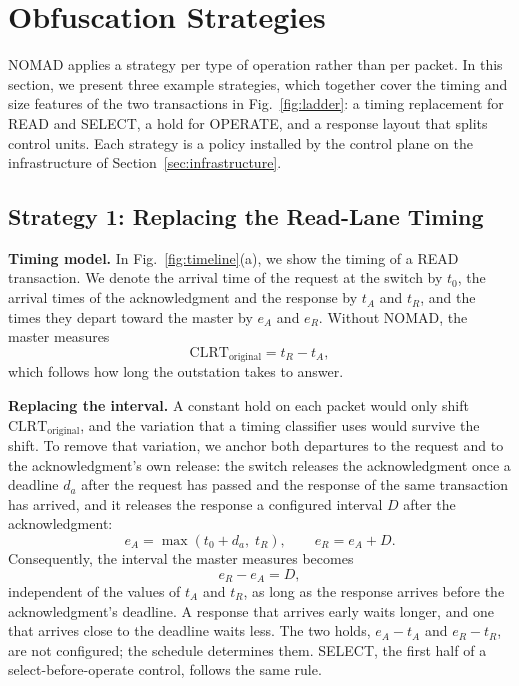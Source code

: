 \section{Obfuscation Strategies}
\label{sec:strategies}

NOMAD applies a strategy per type of operation rather than per packet. In this section, we present three example strategies, which together cover the timing and size features of the two transactions in Fig.~\ref{fig:ladder}: a timing replacement for READ and SELECT, a hold for OPERATE, and a response layout that splits control units. Each strategy is a policy installed by the control plane on the infrastructure of Section~\ref{sec:infrastructure}.

\subsection{Strategy 1: Replacing the Read-Lane Timing}

\textbf{Timing model.} In Fig.~\ref{fig:timeline}(a), we show the timing of a READ transaction. We denote the arrival time of the request at the switch by $t_0$, the arrival times of the acknowledgment and the response by $t_A$ and $t_R$, and the times they depart toward the master by $e_A$ and $e_R$. Without NOMAD, the master measures
\begin{equation}
\label{eq:clrt-original}
\mathrm{CLRT}_{\mathrm{original}} = t_R - t_A ,
\end{equation}
which follows how long the outstation takes to answer.

\textbf{Replacing the interval.} A constant hold on each packet would only shift $\mathrm{CLRT}_{\mathrm{original}}$, and the variation that a timing classifier uses would survive the shift. To remove that variation, we anchor both departures to the request and to the acknowledgment's own release: the switch releases the acknowledgment once a deadline $d_a$ after the request has passed and the response of the same transaction has arrived, and it releases the response a configured interval $D$ after the acknowledgment:
\begin{equation}
\label{eq:release}
e_A = \max(t_0 + d_a,\; t_R), \qquad e_R = e_A + D .
\end{equation}
Consequently, the interval the master measures becomes
\begin{equation}
\label{eq:clrt-new}
e_R - e_A = D ,
\end{equation}
independent of the values of $t_A$ and $t_R$, as long as the response arrives before the acknowledgment's deadline. A response that arrives early waits longer, and one that arrives close to the deadline waits less. The two holds, $e_A - t_A$ and $e_R - t_R$, are not configured; the schedule determines them. SELECT, the first half of a select-before-operate control, follows the same rule.


